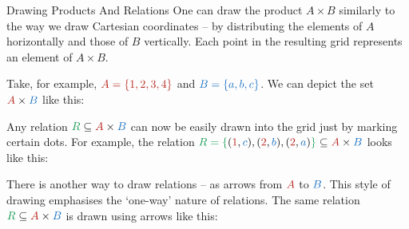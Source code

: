 \documentclass[final]{beamer}
\newlength{\colwidth}
\newcommand{\clr}{\textcolor{BrickRed}}
\newcommand{\clb}{\textcolor{RoyalBlue}}
\newcommand{\clg}{\textcolor{ForestGreen}}
\begin{document}
\begin{frame}[t]
\begin{columns}[t]
\begin{column}{\colwidth}
\begin{block}{Drawing Products And Relations}
 One can draw the product $A \times B$ similarly to the way we draw Cartesian
 coordinates -- by distributing the elements of $A$ horizontally and those of
 $B$ vertically. Each point in the resulting grid represents an element of $A
 \times B$.

 Take, for example, $\clr{A = \{1, 2, 3, 4\}}$ and $\clb{B = \{a, b, c\}}$. We
 can depict the set $\clr{A} \times \clb{B}$ like this:
 \begin{center}
 \end{center}
 Any relation $\clg{R} \subseteq \clr{A} \times \clb{B}$ can now be easily drawn
 into the grid just by marking certain dots. For example, the relation $\clg{R =
 \{}(\clr{1},\clb{c}), (\clr{2},\clb{b}),(\clr{2},\clb{a})\clg{\}} \subseteq
 \clr{A} \times \clb{B}$ looks like this:
 \begin{center}
 \end{center}
 There is another way to draw relations -- as arrows from $\clr{A}$ to
 $\clb{B}$. This style of drawing emphasises the `one-way' nature of relations.
 The same relation $\clg{R} \subseteq \clr{A} \times \clb{B}$ is drawn using
 arrows like this:
 \begin{center}
  \begin{tikzpicture}

\end{tikzpicture}
\end{center}
\end{block}
\end{column}
\end{columns}
\end{frame}
\end{document}
